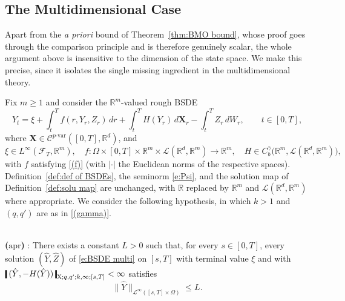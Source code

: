 \documentclass[11pt,reqno]{amsart}
\makeatletter
\newcommand{\cond}[2]{%
    \phantomsection
    \def\@currentlabel{(#1)}%
    \label{#2}%
    \textup{\bf(#1)}
} %
\newenvironment{assumptionp}[1]{
\renewcommand\theassumptionalt{#1}
\assumptionalt
}{\endassumptionalt}
\numberwithin{equation}{section}
\def\R{\mathbb R}
\newcommand{\shortthickbar}{%
  \vcenter{\hbox{\rule{1.8pt}{2.2ex}}}%
}
\newcommand{\thicknm}[1]{%
  \mathopen{\shortthickbar}%
  \mkern4mu #1 \mkern4mu%
  \mathclose{\shortthickbar}%
}
\makeatother
\begin{document}
\subsection{The Multidimensional Case}\label{subsec:Multi dimensional}

Apart from the \emph{a priori} bound of Theorem~\ref{thm:BMO bound}, whose proof goes through the comparison principle and is therefore genuinely scalar, the whole argument above is insensitive to the dimension of the state space. We make this precise, since it isolates the single missing ingredient in the multidimensional theory.

Fix $m\ge 1$ and consider the $\R^m$-valued rough BSDE
\begin{equation}\label{e:BSDE multi}
Y_{t}
=
\xi
+
\int_{t}^{T} f(r,Y_{r},Z_{r})\,dr
+
\int_{t}^{T} H(Y_{r})\,d\mathbf X_r
-
\int_{t}^{T} Z_r\,dW_r,
\qquad t\in[0,T],
\end{equation}
where $\mathbf X \in \mathscr{C}^{p\text{-}\mathrm{var}}([0,T],\R^d)$, and
\begin{equation*}
\xi \in L^{\infty}(\mathcal F_T,\R^m), \quad
f: \Omega\times[0,T]\times \R^m \times \mathscr L(\R^d,\R^m) \to \R^m, \quad
H \in C^{\gamma}_b\big(\R^m, \mathscr L(\R^{d},\R^m)\big),
\end{equation*}
with $f$ satisfying \ref{(f)} (with $|\bm\cdot|$ the Euclidean norms of the
respective spaces). Definition~\ref{def:def of BSDEs}, the seminorm
\eqref{e:Psi}, and the solution map of Definition~\ref{def:solu map} are
unchanged, with $\R$ replaced by $\R^m$ and $\mathscr L(\R^d,\R^m)$ where
appropriate. We consider the following hypothesis, in which $k>1$ and $(q,q')$
are as in \ref{(gamma)}.

\begin{assumptionp}{($\mathbf{A}_{\mathbf{apr}}$)}
\noindent \\[0.5em]
\cond{$\mathrm{apr}$}{(apr)}:
There exists a constant $L>0$ such that, for every $s\in[0,T]$, every solution
$(\hat Y,\hat Z)$ of \eqref{e:BSDE multi} on $[s,T]$ with terminal value $\xi$
and with
$\thicknm{(\hat Y,-H(\hat Y))}_{\mathrm X;q,q';k,\infty;[s,T]} < \infty$
satisfies
\begin{equation*}
\|\hat Y\|_{\mathcal L^{\infty}([s,T]\times\Omega)} \le L.
\end{equation*}
\end{assumptionp}
\end{document}
